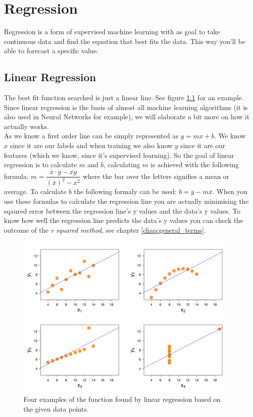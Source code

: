 \chapter{Regression}

Regression is a form of supervised machine learning with as goal to take continuous data and find the equation that best fits the data. This way you'll be able to forecast a specific value.

\section{Linear Regression}
The best fit function searched is just a linear line. See figure \ref{fig:linearregression} for an example. Since linear regression is the basis of almost all machine learning algorithms (it is also used in Neural Networks for example), we will elaborate a bit more on how it actually works. 
\\
As we know a first order line can be simply represented as $y = mx + b$. We know $x$ since it are our labels and when training we also know $y$ since it are our features (which we know, since it's supervised learning). So the goal of linear regression is to calculate $m$ and $b$, calculating $m$ is achieved with the following formula: $m = \dfrac{\overline{x}\cdot\overline{y}-\overline{xy}}{(\overline{x})^2-\overline{x^2}}$ where the bar over the letters signifies a mean or average. To calculate $b$ the following formaly can be used: $b = \overline{y} - m\overline{x}$. When you use these formulas to calculate the regression line you are actually minimising the sqaured error between the regression line's y values and the data's y values. To know how well the regression line predicts the data's y values you can check the outcome of the \emph{r squared method}, see chapter \ref{chap:general_terms}.

\begin{figure}
\centering
\includegraphics[width=1\textwidth]{images/linear_regression.png}
\caption{\label{fig:linearregression}Four examples of the function found by linear regression based on the given data points.}
\end{figure}

